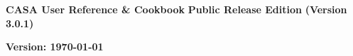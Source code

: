 \pagestyle{empty}

\begin{center}
\Huge
{\bf CASA User Reference \& Cookbook} 
\break 
\break 
\huge
{\bf Public Release Edition}
\break 
\Large
{\bf (Version 3.0.1)}
\end{center}
\normalsize

\begin{figure}[h!]
\begin{center}
\end{center}
\end{figure}


\Large
\begin{center}
{\bf Version: \today}
\end{center}
\normalsize

\pagebreak
